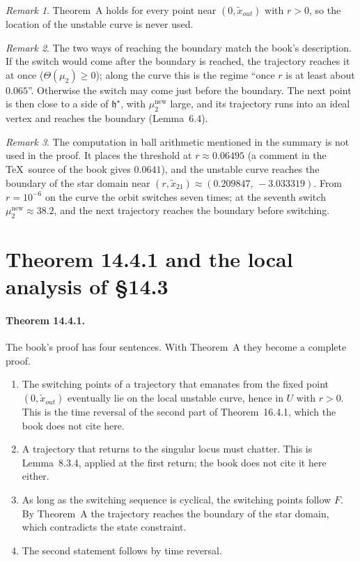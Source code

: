 \documentclass[11pt,a4paper]{article}
\theoremstyle{plain}
\theoremstyle{definition}
\theoremstyle{remark}
\newtheorem*{remark}{Remark}
\newcommand{\hstar}{\mathfrak{h}^{\star}}
\newcommand{\nw}{^{\mathrm{new}}}
\begin{document}
\begin{remark}
Theorem~A holds for every point near $(0,\tilde x_{out})$ with $r>0$, so the location of the
unstable curve is never used.
\end{remark}

\begin{remark}
The two ways of reaching the boundary match the book's description. If the switch would come
after the boundary is reached, the trajectory reaches it at once ($\Theta(\mu_2)\ge0$); along the
curve this is the regime ``once $r$ is at least about $0.065$''. Otherwise the switch may come
just before the boundary. The next point is then close to a side of $\hstar$, with $\mu_2\nw$
large, and its trajectory runs into an ideal vertex and reaches the boundary (Lemma~6.4).
\end{remark}

\begin{remark}
The computation in ball arithmetic mentioned in the summary is not used in the proof. It places
the threshold at $r\approx0.06495$ (a comment in the \TeX\ source of the book gives $0.0641$), and
the unstable curve reaches the boundary of the star domain near
$(r,\tilde x_{21})\approx(0.209847,\,-3.033319)$. From $r=10^{-6}$ on the curve the orbit switches
seven times; at the seventh switch $\mu_2\nw\approx38.2$, and the next trajectory reaches the
boundary before switching.
\end{remark}

\section{Theorem 14.4.1 and the local analysis of \S14.3}

\paragraph{Theorem 14.4.1.} The book's proof has four sentences. With Theorem~A they become a
complete proof.
\begin{enumerate}[itemsep=1pt]
\item The switching points of a trajectory that emanates from the fixed point $(0,\tilde x_{out})$
eventually lie on the local unstable curve, hence in $U$ with $r>0$. This is the time reversal of
the second part of Theorem~16.4.1, which the book does not cite here.
\item A trajectory that returns to the singular locus must chatter. This is Lemma~8.3.4, applied
at the first return; the book does not cite it here either.
\item As long as the switching sequence is cyclical, the switching points follow $F$. By Theorem~A
the trajectory reaches the boundary of the star domain, which contradicts the state constraint.
\item The second statement follows by time reversal.
\end{enumerate}
\end{document}
